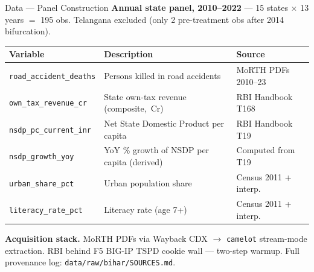 \documentclass[aspectratio=169,11pt]{beamer}
\newcommand{\navy}[1]{\textcolor{NavyPrimary}{\textbf{#1}}}
\newcommand{\rupee}{\faRupeeSign\,}
\newcommand{\toptight}{\vspace{-0.15cm}}
\begin{document}
\begin{frame}{Data --- Panel Construction}
  \toptight
  {\footnotesize\textbf{\navy{Annual state panel, 2010--2022}} ---
   15 states $\times$ 13 years $=$ 195 obs.
   Telangana excluded (only 2 pre-treatment obs after 2014 bifurcation).}

  \vspace{0.25cm}
  \scriptsize
  \begin{tabularx}{\linewidth}{@{}lXl@{}}
    \toprule
    \rowcolor{NavyPrimary}\color{white}\textbf{Variable} &
    \color{white}\textbf{Description} &
    \color{white}\textbf{Source} \\
    \midrule
    \texttt{road\_accident\_deaths} & Persons killed in road accidents
      & MoRTH PDFs 2010--23\\
    \texttt{own\_tax\_revenue\_cr} & State own-tax revenue (composite, \rupee Cr)
      & RBI Handbook T168\\
    \texttt{nsdp\_pc\_current\_inr} & Net State Domestic Product per capita
      & RBI Handbook T19\\
    \texttt{nsdp\_growth\_yoy} & YoY \% growth of NSDP per capita (derived)
      & Computed from T19\\
    \texttt{urban\_share\_pct} & Urban population share
      & Census 2011 + interp.\\
    \texttt{literacy\_rate\_pct} & Literacy rate (age 7+)
      & Census 2011 + interp.\\
    \bottomrule
  \end{tabularx}

  \vspace{0.4cm}
  \begin{tcolorbox}[graybox]
    \scriptsize\textbf{Acquisition stack.} MoRTH PDFs via Wayback CDX
    $\rightarrow$ \texttt{camelot} stream-mode extraction. RBI behind F5
    BIG-IP TSPD cookie wall --- two-step warmup. Full provenance log:
    \texttt{data/raw/bihar/SOURCES.md}.
  \end{tcolorbox}
\end{frame}
\end{document}
